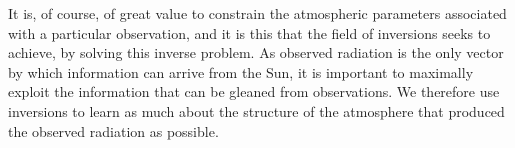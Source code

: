 It is, of course, of great value to constrain the atmospheric parameters associated with a particular observation, and it is this that the field of inversions seeks to achieve, by solving this inverse problem. As observed radiation is the only vector by which information can arrive from the Sun, it is important to maximally exploit the information that can be gleaned from observations. We therefore use inversions to learn as much about the structure of the atmosphere that produced the observed radiation as possible.




